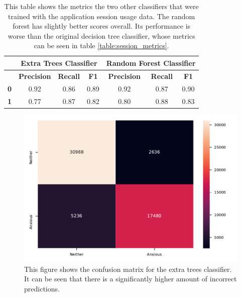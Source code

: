 \documentclass{l4proj}
\begin{document}
\begin{table}[htb]
\centering
\begin{tabular}{@{}lccc|ccc@{}}
\toprule
 & \multicolumn{3}{c|}{\textbf{Extra Trees Classifier}} & \multicolumn{3}{c|}{\textbf{Random Forest Classifier}} \\ \midrule
 & \textbf{Precision} & \textbf{Recall} & \textbf{F1} & \textbf{Precision} & \textbf{Recall} & \textbf{F1} \\
\multicolumn{1}{c}{\textbf{0}} & 0.92 & 0.86 & 0.89 & 0.92 & 0.87 & 0.90 \\
\multicolumn{1}{c}{\textbf{1}} & 0.77 & 0.87 & 0.82 & 0.80 & 0.88 & 0.83 \\ \bottomrule
\end{tabular}
\caption{This table shows the metrics the two other classifiers that were trained with the application session usage data. The random forest has slightly better scores overall. Its performance is worse than the original decision tree classifier, whose metrics can be seen in table \ref{table:session_metrics}.}
\label{table:session_extra_classifier_metrics}
\end{table}

\begin{figure}[htb]
    \centering
    \includegraphics[width=0.80\linewidth]{images/sessions/heatmap_EnsembleExtraTreesSessions.pdf}
    \caption{This figure shows the confusion matrix for the extra trees classifier. It can be seen that there is a significantly higher amount of incorrect predictions.}
    \label{fig:session_extra_trees_matrix} 
\end{figure}
\end{document}
